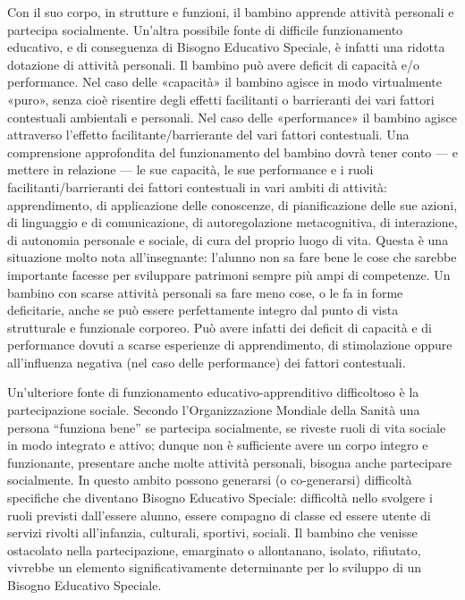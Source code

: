 Con il suo corpo, in strutture e funzioni, il bambino apprende attività personali e partecipa
socialmente. Un'altra possibile fonte di difficile funzionamento educativo, e di conseguenza di
Bisogno Educativo Speciale, è infatti una ridotta dotazione di attività personali. Il bambino può
avere deficit di capacità e/o performance. Nel caso delle «capacità» il bambino agisce in modo
virtualmente «puro», senza cioè risentire degli effetti facilitanti o barrieranti dei vari fattori
contestuali ambientali e personali. Nel caso delle «performance» il bambino agisce attraverso
l'effetto facilitante/barrierante del vari fattori contestuali. Una comprensione approfondita del
funzionamento del bambino dovrà tener conto — e mettere in relazione — le sue capacità, le sue
performance e i ruoli facilitanti/barrieranti dei fattori contestuali in vari ambiti di attività:
apprendimento, di applicazione delle conoscenze, di pianificazione delle sue azioni, di linguaggio e
di comunicazione, di autoregolazione metacognitiva, di interazione, di autonomia personale e
sociale, di cura del proprio luogo di vita. Questa è una situazione molto nota all'insegnante:
l'alunno non sa fare bene le cose che sarebbe importante facesse per sviluppare patrimoni sempre
più ampi di competenze. Un bambino con scarse attività personali sa fare meno cose, o le fa in
forme deficitarie, anche se può essere perfettamente integro dal punto di vista strutturale e
funzionale corporeo. Può avere infatti dei deficit di capacità e di performance dovuti a scarse
esperienze di apprendimento, di stimolazione oppure all'influenza negativa (nel caso delle
performance) dei fattori contestuali.

Un'ulteriore fonte di funzionamento educativo-apprenditivo difficoltoso è la partecipazione
sociale. Secondo l'Organizzazione Mondiale della Sanità una persona “funziona bene” se partecipa
socialmente, se riveste ruoli di vita sociale in modo integrato e attivo; dunque non è sufficiente
avere un corpo integro e funzionante, presentare anche molte attività personali, bisogna anche
partecipare socialmente. In questo ambito possono generarsi (o co-generarsi) difficoltà specifiche
che diventano Bisogno Educativo Speciale: difficoltà nello svolgere i ruoli previsti dall'essere
alunno, essere compagno di classe ed essere utente di servizi rivolti all'infanzia, culturali, sportivi,
sociali. Il bambino che venisse ostacolato nella partecipazione, emarginato o allontanano, isolato,
rifiutato, vivrebbe un elemento significativamente determinante per lo sviluppo di un Bisogno
Educativo Speciale.

